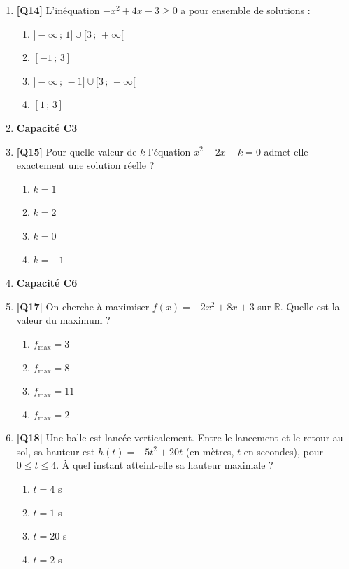 \begin{enumerate}
\item \textbf{[Q14]} L'inéquation $-x^2 + 4x - 3 \geq 0$ a pour ensemble de solutions :
  \begin{enumerate}[label=\Alph*.]
    \item $]-\infty\,;\,1] \cup [3\,;\,+\infty[$
    \item $[-1\,;\,3]$
    \item $]-\infty\,;\,-1] \cup [3\,;\,+\infty[$
    \item $[1\,;\,3]$
  \end{enumerate}

\item[] \textbf{Capacité C3}

\item \textbf{[Q15]} Pour quelle valeur de $k$ l'équation $x^2 - 2x + k = 0$ admet-elle exactement une solution réelle ?
  \begin{enumerate}[label=\Alph*.]
    \item $k = 1$
    \item $k = 2$
    \item $k = 0$
    \item $k = -1$
  \end{enumerate}

\item[] \textbf{Capacité C6}

\item \textbf{[Q17]} On cherche à maximiser $f(x) = -2x^2 + 8x + 3$ sur $\mathbb{R}$. Quelle est la valeur du maximum ?
  \begin{enumerate}[label=\Alph*.]
    \item $f_{\max} = 3$
    \item $f_{\max} = 8$
    \item $f_{\max} = 11$
    \item $f_{\max} = 2$
  \end{enumerate}

\item \textbf{[Q18]} Une balle est lancée verticalement. Entre le lancement et le retour au sol, sa hauteur est $h(t)=-5t^2+20t$ (en mètres, $t$ en secondes), pour $0\leq t\leq4$. À quel instant atteint-elle sa hauteur maximale ?
  \begin{enumerate}[label=\Alph*.]
    \item $t = 4$ s
    \item $t = 1$ s
    \item $t = 20$ s
    \item $t = 2$ s
  \end{enumerate}


\end{enumerate}
